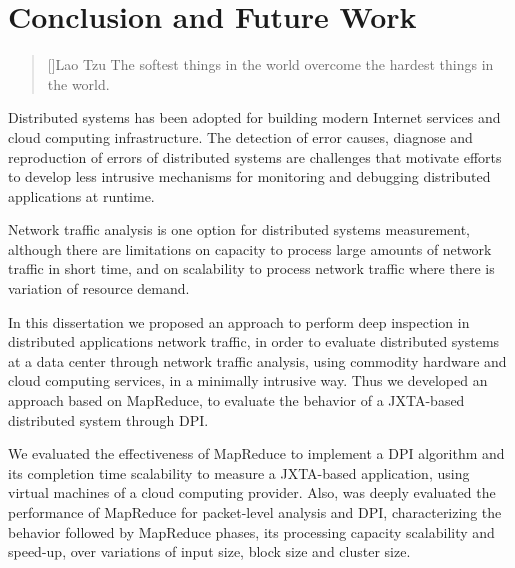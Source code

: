 \chapter{Conclusion and Future Work}
\label{ch:conclusionfuturework}

\begin{quotation}[]{Lao Tzu}
The softest things in the world overcome the hardest things in the world.
\end{quotation}

Distributed systems has been adopted for building modern Internet services and cloud computing infrastructure. The detection of error causes, diagnose and reproduction of errors of distributed systems are challenges that motivate efforts to develop less intrusive mechanisms for monitoring and debugging distributed applications at runtime. 

Network traffic analysis is one option for distributed systems measurement, although there are limitations on capacity to process large amounts of network traffic in short time, and on scalability to process network traffic where there is variation of resource demand.

In this dissertation we proposed an approach to perform deep inspection in distributed applications network traffic, in order to evaluate distributed systems at a data center through network traffic analysis, using commodity hardware and cloud computing services, in a minimally intrusive way. Thus we developed an approach based on MapReduce, to evaluate the behavior of a JXTA-based distributed system through DPI.

We evaluated the effectiveness of MapReduce to implement a DPI algorithm and its completion time scalability to measure a JXTA-based application, using virtual machines of a cloud computing provider. Also, was deeply evaluated the performance of MapReduce for packet-level analysis and DPI, characterizing the behavior followed by MapReduce phases, its processing capacity scalability and speed-up, over variations of input size, block size and cluster size.

